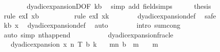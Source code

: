 \begin{isabellebody}
\ \ \ \ \ \ \isamarkupfalse%
\ dyadic{\isacharunderscore}{\kern0pt}expansionD{\isacharparenleft}{\kern0pt}{}{\isacharparenright}{\kern0pt}{\isacharbrackleft}{\kern0pt}OF\ kb{\isacharbrackright}{\kern0pt}\ \isamarkupfalse%
\ {\isacharparenleft}{\kern0pt}simp\ add{\isacharcolon}{\kern0pt}\ field{\isacharunderscore}{\kern0pt}simps{\isacharparenright}{\kern0pt}\isanewline
\ \ \ \ \isamarkupfalse%
\ {\isacharquery}{\kern0pt}thesis\isanewline
\ \ \ \ \ \ \isamarkupfalse%
\ {\isacharparenleft}{\kern0pt}rule\ exI{\isacharbrackleft}{\kern0pt}\ x{\isacharequal}{\kern0pt}{\isachardoublequoteopen}b\ {\isacharat}{\kern0pt}\ {\isacharbrackleft}{\kern0pt}{}{\isacharbrackright}{\kern0pt}{\isachardoublequoteclose}{\isacharbrackright}{\kern0pt}{\isacharparenright}{\kern0pt}\isanewline
\ \ \ \ \ \ \isamarkupfalse%
\ {\isacharparenleft}{\kern0pt}rule\ exI{\isacharbrackleft}{\kern0pt}\ x{\isacharequal}{\kern0pt}{\isachardoublequoteopen}k{\isacharprime}{\kern0pt}{\isachardoublequoteclose}{\isacharbrackright}{\kern0pt}{\isacharparenright}{\kern0pt}\isanewline
\ \ \ \ \ \ \isamarkupfalse%
\ dyadic{\isacharunderscore}{\kern0pt}expansion{\isacharunderscore}{\kern0pt}def\ \isamarkupfalse%
\ safe\isanewline
\ \ \ \ \ \ \isamarkupfalse%
\ kb\ x\ \isamarkupfalse%
\ dyadic{\isacharunderscore}{\kern0pt}expansion{\isacharunderscore}{\kern0pt}def\ \isamarkupfalse%
\ auto\isanewline
\ \ \ \ \ \ \isamarkupfalse%
\ {\isacharparenleft}{\kern0pt}intro\ sum{\isachardot}{\kern0pt}cong{\isacharparenright}{\kern0pt}\isanewline
\ \ \ \ \ \ \ \isamarkupfalse%
\ {\isacharparenleft}{\kern0pt}auto\ simp{\isacharcolon}{\kern0pt}\ nth{\isacharunderscore}{\kern0pt}append{\isacharparenright}{\kern0pt}\isanewline
\ \ \ \ \ \ \isamarkupfalse%
\isanewline
\ \ \isamarkupfalse%
\isanewline
{}\isamarkupfalse%
%
\endisatagproof
{\isafoldproof}%
%
\isadelimproof
%
\endisadelimproof
\isanewline
\isanewline
{}\isamarkupfalse%
\ dyadic{\isacharunderscore}{\kern0pt}expansion{\isacharunderscore}{\kern0pt}frac{\isacharunderscore}{\kern0pt}le{\isacharunderscore}{\kern0pt}{}{\isacharcolon}{\kern0pt}\ \isanewline
\ \ \ {\isachardoublequoteopen}dyadic{\isacharunderscore}{\kern0pt}expansion\ x\ n\ T\ b\ k{\isachardoublequoteclose}\isanewline
\ \ \ {\isachardoublequoteopen}{\isacharparenleft}{\kern0pt}{\isasymSum}m{\isasymin}{\isacharbraceleft}{\kern0pt}{}{\isachardot}{\kern0pt}{\isachardot}{\kern0pt}n{\isacharbraceright}{\kern0pt}{\isachardot}{\kern0pt}\ {\isacharparenleft}{\kern0pt}b\ {\isacharbang}{\kern0pt}\ {\isacharparenleft}{\kern0pt}m{\isacharminus}{\kern0pt}{}{\isacharparenright}{\kern0pt}{\isacharparenright}{\kern0pt}\ {\isacharslash}{\kern0pt}\ {}\ {\isacharcircum}{\kern0pt}\ m{\isacharparenright}{\kern0pt}\ {\isacharless}{\kern0pt}\ {}{\isachardoublequoteclose}\isanewline

\end{isabellebody}
